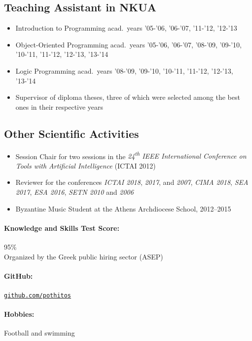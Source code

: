 \documentclass[a4paper]{article}
\begin{document}
\begin{cv}{}
\subsection*{Teaching Assistant in NKUA}
\begin{itemize}
  \item \textsf{Introduction to Programming} acad.\ years
        '05-'06, '06-'07, '11-'12, '12-'13
  \item \textsf{Object-Oriented Programming} acad.\ years
        '05-'06, '06-'07, '08-'09, '09-'10, '10-'11,
        '11-'12, '12-'13, '13-'14
  \item \textsf{Logic Programming} acad.\ years '08-'09,
        '09-'10, '10-'11, '11-'12, '12-'13, '13-'14
  \item \textsf{Supervisor} of diploma theses, three of
        which were selected among the best ones in their
        respective years
\end{itemize}

\subsection*{Other Scientific Activities}
\begin{itemize}
  \item \textsf{Session Chair} for two sessions in the
        \emph{24\textsuperscript{th} IEEE International
        Conference on Tools with Artificial Intelligence}
        (ICTAI 2012)
  \item \textsf{Reviewer} for the conferences \emph{ICTAI
        2018}, \emph{2017}, and \emph{2007}, \emph{CIMA
        2018}, \emph{SEA 2017}, \emph{ESA 2016}, \emph{SETN
        2010} and \emph{2006}
  \item \textsf{Byzantine Music Student} at the Athens
         Archdiocese School, 2012--2015
\end{itemize}

\paragraph{Knowledge and Skills Test Score:} 95\% \\
Organized by the Greek public hiring sector (ASEP)

\paragraph{GitHub:}
\href{https://github.com/pothitos}{\texttt{github.com/pothitos}}

\paragraph{Hobbies:} Football and swimming

\date{}

\end{cv}
\end{document}
